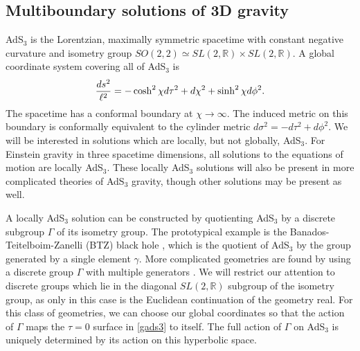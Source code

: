 \documentclass[12pt]{article}
\newcommand{\RR}{\mathbb{R}} %
\numberwithin{equation}{section}
\begin{document}
%
\subsection{Multiboundary solutions of 3D gravity}
%
\label{quotientreview}

AdS${}_3$ is the Lorentzian, maximally symmetric spacetime with constant negative curvature and isometry group $SO(2,2)\simeq SL(2,\RR)\times SL(2,\RR)$. A global coordinate system covering all of AdS$_3$ is
%
\begin{equation} \label{gads3}
{ds^2 \over \ell^2} = -\cosh^2 \chi d \tau^2 + d\chi^2 + \sinh^2 \chi d \phi^2.
\end{equation}
%
The spacetime has a conformal boundary at $\chi \to \infty$.  The induced metric on this boundary is conformally equivalent to the cylinder metric $d\sigma^2 = -d\tau^2 + d\phi^2$.
We will be interested in solutions which are locally, but not globally, AdS${}_3$.
 For Einstein gravity in three spacetime dimensions, all solutions to the equations of motion are  locally AdS${}_3$.
These locally AdS${}_3$ solutions will also be present in more complicated theories of AdS${}_3$ gravity, though other solutions may be present as well.


A locally AdS$_3$ solution can be constructed by quotienting AdS$_3$ by a discrete subgroup $\Gamma$ of its isometry group.
The prototypical example is the Banados-Teitelboim-Zanelli (BTZ) black hole \cite{Banados:1992wn}, which
is the quotient of AdS${}_3$ by the group generated by a single element $\gamma$. More complicated geometries are found by using a discrete group $\Gamma$ with multiple generators \cite{Brill:1995jv,Aminneborg:1997pz,Brill:1998pr,Aminneborg:1998si}.  We will restrict our attention to discrete groups which lie in the diagonal  $SL(2,\RR)$ subgroup of  the isometry group, as only in this case is the Euclidean continuation of the geometry real.
For this class of geometries, we can choose our global coordinates so that the action of $\Gamma$ maps the $\tau=0$ surface in \eqref{gads3} to itself.  The full action of $\Gamma$ on AdS$_3$ is uniquely determined by its action on this hyperbolic space.
\end{document}
